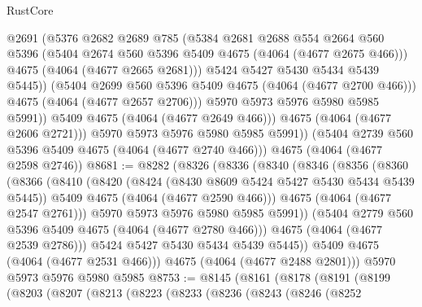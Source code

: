 \begin{lexlean}{RustCore}
\begin{coremodule}
                    @2691
                    (@5376
                      @2682
                      @2689
                      @785
                      (@5384
                        @2681
                        @2688
                        @554
                        @2664
                        @560
                        @5396
                        (@5404 @2674 @560 @5396 @5409 @4675 (@4064 (@4677 @2675 @466)))
                        @4675
                        (@4064 (@4677 @2665 @2681)))
                      @5424
                      @5427
                      @5430
                      @5434
                      @5439
                      @5445))
                  (@5404 @2699 @560 @5396 @5409 @4675 (@4064 (@4677 @2700 @466)))
                  @4675
                  (@4064 (@4677 @2657 @2706)))
                @5970
                @5973
                @5976
                @5980
                @5985
                @5991))
            @5409
            @4675
            (@4064 (@4677 @2649 @466)))
          @4675
          (@4064 (@4677 @2606 @2721)))
        @5970
        @5973
        @5976
        @5980
        @5985
        @5991))
    (@5404 @2739 @560 @5396 @5409 @4675 (@4064 (@4677 @2740 @466)))
    @4675
    (@4064 (@4677 @2598 @2746))
@8681 := @8282
    (@8326
      (@8336
        (@8340
          (@8346
            (@8356
              (@8360
                (@8366
                  (@8410
                    (@8420
                      (@8424 (@8430 @8609 @5424 @5427 @5430 @5434 @5439 @5445))
                      @5409
                      @4675
                      (@4064 (@4677 @2590 @466)))
                    @4675
                    (@4064 (@4677 @2547 @2761)))
                  @5970
                  @5973
                  @5976
                  @5980
                  @5985
                  @5991))
              (@5404 @2779 @560 @5396 @5409 @4675 (@4064 (@4677 @2780 @466)))
              @4675
              (@4064 (@4677 @2539 @2786)))
            @5424
            @5427
            @5430
            @5434
            @5439
            @5445))
        @5409
        @4675
        (@4064 (@4677 @2531 @466)))
      @4675
      (@4064 (@4677 @2488 @2801)))
    @5970
    @5973
    @5976
    @5980
    @5985
@8753 := @8145
    (@8161
      (@8178
        (@8191
          (@8199
            (@8203
              (@8207
                (@8213
                  (@8223
                    (@8233
                      (@8236
                        (@8243
                          (@8246
                            (@8252

\end{coremodule}
\end{lexlean}
